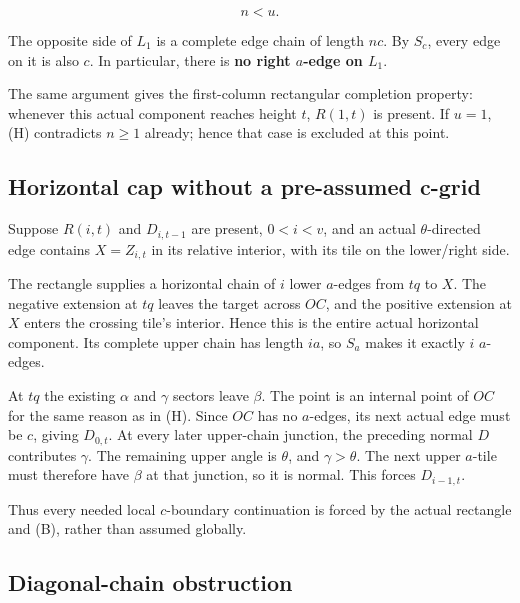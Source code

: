 \documentclass[
  11pt,
  a4paper,
]{article}
\begin{document}
\[
\boxed{n<u.}
\tag{H}
\]

The opposite side of \(L_1\) is a complete edge chain of length \(nc\).
By \(S_c\), every edge on it is also \(c\). In particular, there is
\textbf{no right \(a\)-edge on \(L_1\)}.

The same argument gives the first-column rectangular completion
property: whenever this actual component reaches height \(t\),
\(R(1,t)\) is present. If \(u=1\), (H) contradicts \(n\ge1\) already;
hence that case is excluded at this point.

\hypertarget{horizontal-cap-without-a-pre-assumed-c-grid}{%
\subsection{Horizontal cap without a pre-assumed
c-grid}\label{horizontal-cap-without-a-pre-assumed-c-grid}}

Suppose \(R(i,t)\) and \(D_{i,t-1}\) are present, \(0<i<v\), and an
actual \(\theta\)-directed edge contains \(X=Z_{i,t}\) in its relative
interior, with its tile on the lower/right side.

The rectangle supplies a horizontal chain of \(i\) lower \(a\)-edges
from \(tq\) to \(X\). The negative extension at \(tq\) leaves the target
across \(OC\), and the positive extension at \(X\) enters the crossing
tile's interior. Hence this is the entire actual horizontal component.
Its complete upper chain has length \(ia\), so \(S_a\) makes it exactly
\(i\) \(a\)-edges.

At \(tq\) the existing \(\alpha\) and \(\gamma\) sectors leave
\(\beta\). The point is an internal point of \(OC\) for the same reason
as in (H). Since \(OC\) has no \(a\)-edges, its next actual edge must be
\(c\), giving \(D_{0,t}\). At every later upper-chain junction, the
preceding normal \(D\) contributes \(\gamma\). The remaining upper angle
is \(\theta\), and \(\gamma>\theta\). The next upper \(a\)-tile must
therefore have \(\beta\) at that junction, so it is normal. This forces
\(D_{i-1,t}\).

Thus every needed local \(c\)-boundary continuation is forced by the
actual rectangle and (B), rather than assumed globally.

\hypertarget{diagonal-chain-obstruction}{%
\subsection{Diagonal-chain
obstruction}\label{diagonal-chain-obstruction}}
\end{document}
